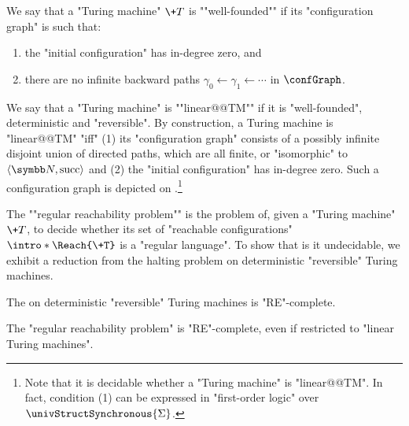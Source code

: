 We say that a "Turing machine" $\+T$ is ""well-founded"" if its "configuration graph" is such that:
\begin{enumerate}
    \item the "initial configuration" has in-degree zero, and
    \item there are no infinite backward paths $\gamma_0 \leftarrow \gamma_1 \leftarrow \cdots$ in $\confGraph$. 
\end{enumerate}

We say that a "Turing machine" is \AP""linear@@TM"" if it is "well-founded", deterministic and "reversible".
By construction, a Turing machine is "linear@@TM" "iff" (1) its "configuration graph" consists of a possibly infinite disjoint union of directed paths, which are all finite, or "isomorphic" to $\tup{\N, \textrm{succ}}$ and (2) the "initial configuration" has in-degree zero.
Such a configuration graph is depicted on
.\footnote{Note
that it is decidable whether a "Turing machine" is "linear@@TM". In fact, condition (1) can be expressed in "first-order logic" over $\univStructSynchronous{\Sigma}$.}

\AP The ""regular reachability problem"" is the problem of, given a "Turing machine" $\+T$, to decide whether its set of "reachable configurations" \AP$\intro*\Reach{\+T}$ is a "regular language". To show that is it undecidable, we exhibit a reduction from the halting problem on deterministic "reversible" Turing machines.

\begin{proposition}
    \AP\label{prop:halting-problem-detrevTM}
    The  on deterministic "reversible" Turing machines is "RE"-complete.
\end{proposition}

\begin{lemma}
    \AP\label{lem:regular-reachability}
    The "regular reachability problem" is "RE"-complete, even if restricted
    to "linear Turing machines".
\end{lemma}

